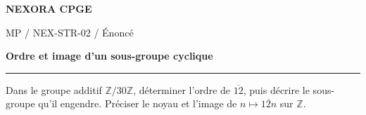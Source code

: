 \documentclass[11pt,a4paper]{article}
\begin{document}
{\small\bfseries\color{nexorablue} NEXORA CPGE}\par
{\small MP / NEX-STR-02 / Énoncé}\par
{\LARGE\bfseries Ordre et image d’un sous-groupe cyclique}\par
\vspace{0.25em}\hrule\vspace{0.6em}

Dans le groupe additif $\mathbb Z/30\mathbb Z$, déterminer l’ordre de $\overline{12}$, puis décrire le sous-groupe qu’il engendre. Préciser le noyau et l’image de $n\mapsto\overline{12n}$ sur $\mathbb Z$.
\end{document}

